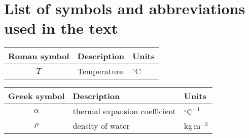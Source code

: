 \chapter*{List of symbols and abbreviations used in the text}

	\setlongtables
	\begin{longtable}{cll}
	\hline
	Roman symbol & Description & Units\\
	\hline
	\endhead
	\hline
	\endfoot
	$T$ & Temperature & $^\circ$C\\
\hline
\end{longtable}

	\setlongtables
\begin{longtable}{cll}
\hline
Greek symbol & Description & Units\\
\hline
\endhead
\hline
\endfoot
$\alpha$ & thermal expansion coefficient & $^\circ\textrm{C}^{-1}$\\
$\rho$ & density of water & kg\,m$^{-3}$\\
\hline
\end{longtable}


